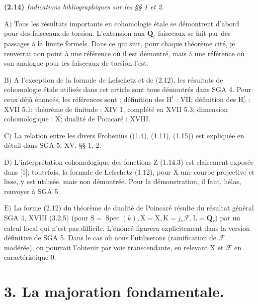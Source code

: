 \documentclass[10pt,leqno]{article}
\begin{document}
\noindent \textbf{(2.14)} \emph{Indications bibliographiques sur les §§ 1 et 2.}\par

\noindent \(\mathrm{A})\) Tous les résultats importants en cohomologie étale se démontrent d’abord pour des faisceaux de torsion. L’extension aux \(\mathbf{Q}_{\ell }\)-faisceaux se fait par des passages à la limite formels. Dans ce qui suit, pour chaque théorème cité, je renverrai non point à une référence où il est démontré, mais à une référence où son analogue pour les faisceaux de torsion l’est.\par

\noindent \(\mathrm{B})\) A l’exception de la formule de Lefschetz et de (2.12), les résultats de cohomologie étale utilisés dans cet article sont tous démontrés dans SGA 4. Pour ceux déjà énoncés, les références sont : définition des \(\mathrm{H}^{i}\) : VII; définition des \(\mathrm{H}_{c}^{i}\) : XVII 5.1; théorème de finitude : XIV 1, complété en XVII 5.3; dimension cohomologique : \(\mathrm{X}\); dualité de Poincaré : XVIII.\par

\noindent \(\mathrm{C})\) La relation entre les divers Frobenius ((1.4), (1.11), (1.15)) est expliquée en détail dans SGA 5, XV, §§ 1, 2.\par

\noindent \(\mathrm{D})\) L’interprétation cohomologique des fonctions Z (1.14.3) est clairement exposée dans [1]; toutefois, la formule de Lefschetz (1.12), pour \(\mathrm{X}\) une courbe projective et lisse, y est utilisée, mais non démontrée. Pour la démonstration, il faut, hélas, renvoyer à SGA 5.\par

\noindent \(\mathrm{E})\) La forme (2.12) du théorème de dualité de Poincaré résulte du résultat général SGA 4, XVIII (3.2.5) (pour \(\mathrm{S}=\operatorname{Spec}(k), \mathrm{X}=\mathrm{X}, \mathrm{K}=j_{*}\mathcal{F} , \mathrm{L}=\mathbf{Q}_{\ell })\) par un calcul local qui n’est pas difficile. L’énoncé figurera explicitement dans la version définitive de SGA 5. Dans le cas où nous l’utiliserons (ramification de \(\mathcal{F} \) modérée), on pourrait l’obtenir par voie transcendante, en relevant \(\mathrm{X}\) et \(\mathcal{F} \) en caractéristique 0.\par

\section*{3. La majoration fondamentale.}
\end{document}
